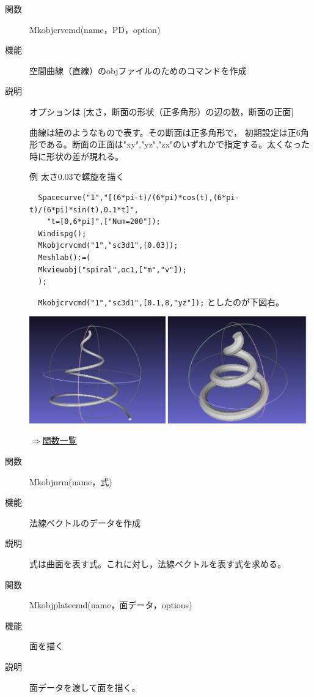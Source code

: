 \documentclass[papersize,a4paper,12pt,uplatex]{jsarticle}
\begin{document}
\begin{description}
\vspace{\baselineskip}
\hypertarget{mkobjcrvcmd}{}
\item[関数]  Mkobjcrvcmd(name，PD，option)
\item[機能]  空間曲線（直線）のobjファイルのためのコマンドを作成
\item[説明]  オプションは [太さ，断面の形状（正多角形）の辺の数，断面の正面]

曲線は紐のようなもので表す。その断面は正多角形で， 初期設定は正6角形である。断面の正面は"xy","yz","zx"のいずれかで指定する。太くなった時に形状の差が現れる。

例  太さ0.03で螺旋を描く
\begin{verbatim}
  Spacecurve("1","[(6*pi-t)/(6*pi)*cos(t),(6*pi-t)/(6*pi)*sin(t),0.1*t]",
    "t=[0,6*pi]",["Num=200"]);
  Windispg();
  Mkobjcrvcmd("1","sc3d1",[0.03]);
  Meshlab():=(
  Mkviewobj("spiral",oc1,["m","v"]); 
  );
\end{verbatim}

\verb|  Mkobjcrvcmd("1","sc3d1",[0.1,8,"yz"]);| としたのが下図右。
  
 \includegraphics[bb=0 0 614.53 236.51 , width=12cm]{Fig/meshlab02.pdf}
  
\begin{flushright}  \hyperlink{functionlist}{$\Rightarrow$関数一覧}\end{flushright}

\vspace{\baselineskip}
\hypertarget{mkobjnrm}{}
\item[関数]  Mkobjnrm(name，式)
\item[機能]  法線ベクトルのデータを作成
\item[説明]  式は曲面を表す式。これに対し，法線ベクトルを表す式を求める。

\vspace{\baselineskip}
\hypertarget{mkobjplatecmd}{}
\item[関数]  Mkobjplatecmd(name，面データ，options)
\item[機能]  面を描く
\item[説明]  面データを渡して面を描く。


\end{description}
\end{document}
